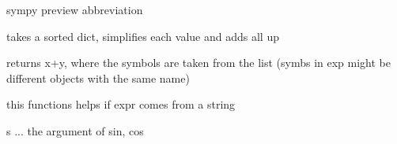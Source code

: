 \documentclass[letterpaper,10pt,english]{sphinxmanual}
\begin{document}
\begin{fulllineitems}
\label{pycontroltools:auxfuncs.programming.miscprog.prev}
sympy preview abbreviation

\end{fulllineitems}


\begin{fulllineitems}
\label{pycontroltools:auxfuncs.programming.miscprog.rev_tuple}
\end{fulllineitems}


\begin{fulllineitems}
\label{pycontroltools:auxfuncs.programming.miscprog.simp_trig_dict}
takes a sorted dict, simplifies each value and adds all up

\end{fulllineitems}


\begin{fulllineitems}
\label{pycontroltools:auxfuncs.programming.miscprog.subs_same_symbs}
returns x+y, where the symbols are taken from the list
(symbs in exp might be different objects with the same name)

this functions helps if expr comes from a string

\end{fulllineitems}


\begin{fulllineitems}
\label{pycontroltools:auxfuncs.programming.miscprog.trig_term_poly}
s ... the argument of sin, cos

\end{fulllineitems}
\end{document}
